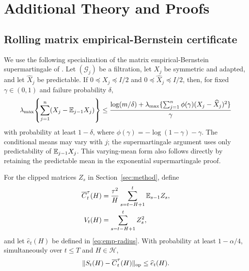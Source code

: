 \section{Additional Theory and Proofs}
\label{app:proofs}

\subsection{Rolling matrix empirical-Bernstein certificate}

We use the following specialization of the matrix empirical-Bernstein supermartingale of \citet{wang2024matrixeb}.  Let $(\mathcal G_j)$ be a filtration, let $X_j$ be symmetric and adapted, and let $\widehat X_j$ be predictable.  If $0\preceq X_j\preceq I/2$ and $0\preceq\widehat X_j\preceq I/2$, then, for fixed $\gamma\in(0,1)$ and failure probability $\delta$,
\begin{equation}
 \lambda_{\max}\!\left\{\sum_{j=1}^n(X_j-\mathbb E_{j-1}X_j)\right\}
 \le \frac{\log(m/\delta)+\lambda_{\max}\{\sum_{j=1}^n\phi(\gamma)(X_j-\widehat X_j)^2\}}{\gamma}
 \label{eq:wr-special}
\end{equation}
with probability at least $1-\delta$, where $\phi(\gamma)=-\log(1-\gamma)-\gamma$.  The conditional means may vary with $j$; the supermartingale argument uses only predictability of $\mathbb E_{j-1}X_j$.  This varying-mean form also follows directly by retaining the predictable mean in the exponential supermartingale proof.

\begin{lemma}
\label{lem:eb}
For the clipped matrices $Z_s$ in Section~\ref{sec:method}, define
\begin{align}
 \overline C_t^\tau(H)&=\frac{\tau^2}{H}\sum_{s=t-H+1}^t\mathbb E_{s-1}Z_s,\\
 V_t(H)&=\sum_{s=t-H+1}^t Z_s^2,
\end{align}
and let $\widehat e_t(H)$ be defined in \eqref{eq:emp-radius}.  With probability at least $1-\alpha/4$, simultaneously over $t\le T$ and $H\in\mathcal H$,
\begin{equation}
 \|S_t(H)-\overline C_t^\tau(H)\|_{\mathrm{op}}\le \widehat e_t(H).
 \label{eq:eb-event}
\end{equation}
\end{lemma}

